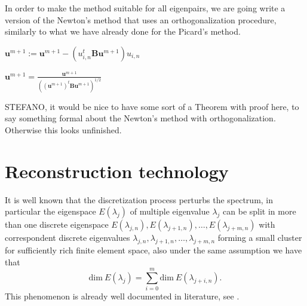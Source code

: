 \documentclass[preprint,12pt]{elsarticle}
\begin{document}
In order to make the method suitable for all eigenpairs, we are going write a version of the Newton's method that uses an orthogonalization procedure, similarly to what we have already done for the Picard's method.
\begin{algorithm}[H] \caption{Newton's method with orthogonalization} \label{alg:newton_ortho} 
\begin{algorithmic}

    

\REPEAT



\STATE $\mathbf{u}^{m+1}:=\mathbf{u}^{m+1}-(u_{i,n}^t\mathbf{B}\mathbf{u}^{m+1})u_{i,n}$
\ENDFOR


\STATE $\displaystyle \mathbf{u}^{m+1}=\frac{\mathbf{u}^{m+1}}{((\mathbf{u}^{m+1})^t\mathbf{B}\mathbf{u}^{m+1})^{1/2}}$
\end{algorithmic}
\end{algorithm}

{\red STEFANO, it would be nice to have some sort of a Theorem with proof here, to 
say something formal about the Newton's method with orthogonalization. Otherwise this 
looks unfinished.}


\section{Reconstruction technology}\label{sec:reco}

It is well known that the discretization process perturbs the spectrum, in particular the eigenspace $E(\lambda_j)$ of multiple eigenvalue $\lambda_j$ can be split in more than one discrete eigenspace $E(\lambda_{j,n}),E(\lambda_{j+1,n}),\dots,E(\lambda_{j+m,n})$ with correspondent discrete eigenvalues $\lambda_{j,n},\lambda_{j+1,n},\dots,\lambda_{j+m,n}$ forming a small cluster for sufficiently rich finite element space, also under the same assumption we have that
$$
\mathrm{dim}\ E(\lambda_j)=\sum_{i=0}^m\mathrm{dim}\ E(\lambda_{j+i,n}).
$$
This phenomenon is already well documented in literature,  see \cite{strang, babuska, hackbusch}.
\end{document}
